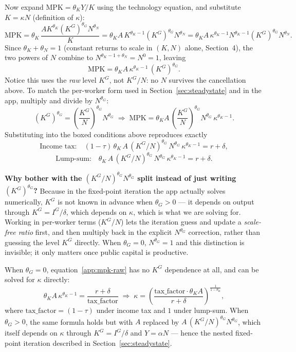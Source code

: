 \documentclass[11pt]{article}
\newcommand{\eq}[1]{\begin{equation}#1\end{equation}}
\begin{document}
Now expand $\mathrm{MPK}=\theta_K Y/K$ using the technology equation, and
substitute $K=\kappa N$ (definition of $\kappa$):
\eq{
\mathrm{MPK} = \theta_K\,\frac{A K^{\theta_K}(K^G)^{\theta_G}N^{\theta_N}}{K}
= \theta_K A\,K^{\theta_K-1}(K^G)^{\theta_G}N^{\theta_N}
= \theta_K A\,\kappa^{\theta_K-1}N^{\theta_K-1}(K^G)^{\theta_G}N^{\theta_N}.
}
Since $\theta_K+\theta_N=1$ (constant returns to scale in $(K,N)$ alone,
Section~4), the two powers of $N$ combine to $N^{\theta_K-1+\theta_N}=N^0=1$,
leaving
\eq{ \mathrm{MPK} = \theta_K A\,\kappa^{\theta_K-1}\,(K^G)^{\theta_G}. \label{app:mpk-raw} }
Notice this uses the \emph{raw} level $K^G$, not $K^G/N$: no $N$ survives
the cancellation above. To match the per-worker form used in
Section~\ref{sec:steadystate} and in the app, multiply and divide by
$N^{\theta_G}$:
\eq{ (K^G)^{\theta_G} = \left(\frac{K^G}{N}\right)^{\theta_G}N^{\theta_G} \;\Longrightarrow\; \mathrm{MPK} = \theta_K A\,\left(\frac{K^G}{N}\right)^{\theta_G}N^{\theta_G}\,\kappa^{\theta_K-1}. }
Substituting into the boxed conditions above reproduces exactly
\eq{ \text{Income tax:}\quad (1-\tau)\,\theta_K\,A\,(K^G/N)^{\theta_G}\,N^{\theta_G}\,\kappa^{\theta_K-1}=r+\delta, }
\eq{ \text{Lump-sum:}\quad \theta_K\,A\,(K^G/N)^{\theta_G}\,N^{\theta_G}\,\kappa^{\theta_K-1}=r+\delta. }
\begin{notebox}
\textbf{Why bother with the $(K^G/N)^{\theta_G}N^{\theta_G}$ split instead
of just writing $(K^G)^{\theta_G}$?} Because in the fixed-point iteration
the app actually solves numerically, $K^G$ is not known in advance when
$\theta_G>0$ --- it depends on output through $K^G=I^G/\delta$, which
depends on $\kappa$, which is what we are solving for. Working in
per-worker terms ($K^G/N$) lets the iteration guess and update a
\emph{scale-free ratio} first, and then multiply back in the explicit
$N^{\theta_G}$ correction, rather than guessing the level $K^G$ directly.
When $\theta_G=0$, $N^{\theta_G}=1$ and this distinction is invisible; it
only matters once public capital is productive.
\end{notebox}

When $\theta_G=0$, equation~\eqref{app:mpk-raw} has no $K^G$ dependence at
all, and can be solved for $\kappa$ directly:
\eq{ \theta_K A\,\kappa^{\theta_K-1} = \frac{r+\delta}{\text{tax\_factor}} \;\Longrightarrow\; \kappa = \left(\frac{\text{tax\_factor}\cdot\theta_K A}{r+\delta}\right)^{\frac{1}{1-\theta_K}}, }
where $\text{tax\_factor}=(1-\tau)$ under income tax and $1$ under
lump-sum. When $\theta_G>0$, the same formula holds but with $A$ replaced
by $A\,(K^G/N)^{\theta_G}N^{\theta_G}$, which itself depends on $\kappa$
through $K^G=I^G/\delta$ and $Y=\alpha N$ --- hence the nested fixed-point
iteration described in Section~\ref{sec:steadystate}.
\end{document}
